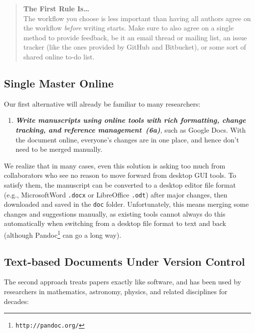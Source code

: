 \documentclass[10pt,letterpaper]{article}
\newcommand{\withurl}[2]{{#1}\footnote{{\texttt{#2}}}}
\newcommand{\practice}[2]{\textbf{\emph{{#2}~({#1})}}}
\begin{document}
\begin{quote}
  \noindent \textbf{The First Rule Is{\ldots}}
  \\
  The workflow you choose is less important than having all authors
  agree on the workflow \emph{before} writing starts. Make sure to
  also agree on a single method to provide feedback, be it an email
  thread or mailing list, an issue tracker (like the ones provided by
  GitHub and Bitbucket), or some sort of shared online to-do list.
\end{quote}

\subsection*{Single Master Online}

Our first alternative will already be familiar to many researchers:

\begin{enumerate}

\item

  \practice{6a}{Write manuscripts using online tools with rich
  formatting, change tracking, and reference management}, such as
  Google Docs. With the document online, everyone's changes are in one
  place, and hence don't need to be merged manually.

\end{enumerate}

We realize that in many cases, even this solution is asking too much
from collaborators who see no reason to move forward from desktop GUI
tools. To satisfy them, the manuscript can be converted to a desktop
editor file format (e.g., Microsoft\textregistered Word \texttt{.docx}
or LibreOffice \texttt{.odt}) after major changes, then downloaded and
saved in the \texttt{doc} folder. Unfortunately, this means merging
some changes and suggestions manually, as existing tools cannot always
do this automatically when switching from a desktop file format to
text and back (although \withurl{Pandoc}{http://pandoc.org/} can go a
long way).

\subsection*{Text-based Documents Under Version Control}

The second approach treats papers exactly like software, and has been
used by researchers in mathematics, astronomy, physics, and related
disciplines for decades:
\end{document}
